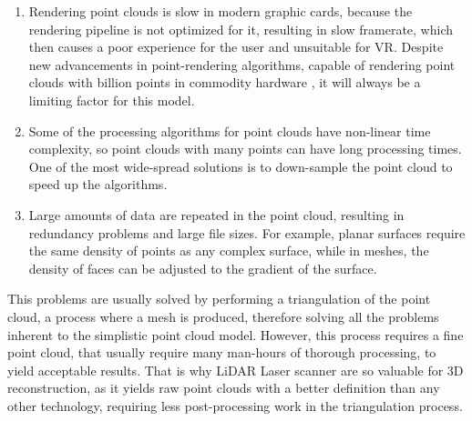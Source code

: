 \begin{enumerate}
    \item Rendering point clouds is slow in modern graphic cards, because the rendering pipeline is not optimized for it, resulting in slow framerate, which then causes a poor experience for the user and unsuitable for VR. Despite new advancements in point-rendering algorithms, capable of rendering point clouds with billion points in commodity hardware \cite{wimmer2006}, it will always be a limiting factor for this model.
    \item Some of the processing algorithms for point clouds have non-linear time complexity, so point clouds with many points can have long processing times. One of the most wide-spread solutions is to down-sample the point cloud to speed up the algorithms.
    \item Large amounts of data are repeated in the point cloud, resulting in redundancy problems and large file sizes. For example, planar surfaces require the same density of points as any complex surface, while in meshes, the density of faces can be adjusted to the gradient of the surface.
\end{enumerate}

This problems are usually solved by performing a triangulation of the point cloud, a process where a mesh is produced, therefore solving all the problems inherent to the simplistic point cloud model. However, this process requires a fine point cloud, that usually require many man-hours of thorough processing, to yield acceptable results. That is why LiDAR Laser scanner are so valuable for 3D reconstruction, as it yields raw point clouds with a better definition than any other technology, requiring less post-processing work in the triangulation process.


